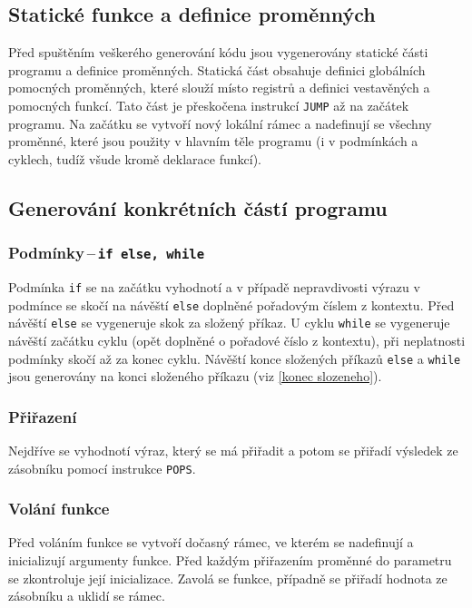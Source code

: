 \documentclass[a4paper, 12pt]{article}
\begin{document}
    \subsection{Statické funkce a definice proměnných}
    Před spuštěním veškerého generování kódu jsou vygenerovány statické části programu a definice proměnných. Statická část obsahuje definici globálních pomocných proměnných, které slouží místo registrů a definici vestavěných a pomocných funkcí. Tato část je přeskočena instrukcí \texttt{JUMP} až na začátek programu. Na začátku se vytvoří nový lokální rámec a nadefinují se všechny proměnné, které jsou použity v hlavním těle programu (i v podmínkách a cyklech, tudíž všude kromě deklarace funkcí).

    \subsection{Generování konkrétních částí programu}

    \subsubsection{Podmínky\,--\,\texttt{if else, while}}
    Podmínka \texttt{if} se na začátku vyhodnotí a v případě nepravdivosti výrazu v podmínce se skočí na návěští \texttt{else} doplněné pořadovým číslem z kontextu. Před návěští \texttt{else} se vygeneruje skok za složený příkaz. U cyklu \texttt{while} se vygeneruje návěští začátku cyklu (opět doplněné o pořadové číslo z kontextu), při neplatnosti podmínky skočí až za konec cyklu. Návěští konce složených příkazů \texttt{else} a \texttt{while} jsou generovány na konci složeného příkazu (viz \ref{konec slozeneho}).

    \subsubsection{Přiřazení}
    Nejdříve se vyhodnotí výraz, který se má přiřadit a potom se přiřadí výsledek ze zásobníku pomocí instrukce \texttt{POPS}.

    \subsubsection{Volání funkce}
    Před voláním funkce se vytvoří dočasný rámec, ve kterém se nadefinují a inicializují argumenty funkce. Před každým přiřazením proměnné do parametru se zkontroluje její inicializace. Zavolá se funkce, případně se přiřadí hodnota ze zásobníku a uklidí se rámec.
\end{document}
